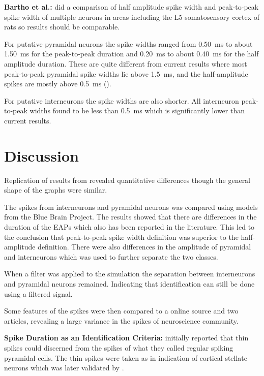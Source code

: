 \documentclass[altfont, fleqn]{uiophd}
\renewcommand{\cref}[1]{{\color{viridis_03}\mycref{#1}}}
\begin{document}
\noindent
{\bf Bartho et al.:}
\Textcite{bartho_characterization_2004}
did a comparison of half amplitude spike width and peak-to-peak spike
width of multiple neurons in areas including the 
L5 somatosensory cortex of rats 
so results should be comparable. 

For putative pyramidal neurons the 
spike widths ranged from 
\SI{0.50}{\milli\second} 
to about
\SI{1.50}{\milli\second} 
for the peak-to-peak duration 
and
\SI{0.20}{\milli\second} 
to about
\SI{0.40}{\milli\second} 
for the half amplitude duration. 
These are quite different from current results where
most peak-to-peak pyramidal spike widths lie above
\SI{1.5}{\milli\second}, 
and the half-amplitude spikes are mostly above
\SI{0.5}{\milli\second} 
(\cref{fig:4_width_I_II_histograms}).

For putative interneurons the 
spike widths are also shorter. 
All interneuron peak-to-peak widths found to be less than
\SI{0.5}{\milli\second} 
which is significantly lower than current results. 
\newline

\chapter{Discussion}
Replication of results from 
\textcite{pettersen_amplitude_2008}
revealed quantitative differences though
the general shape of the graphs were similar.

The spikes from interneurons and pyramidal neurons
was compared using models from the Blue Brain Project. 
The results showed that there are differences in the 
duration of the EAPs which
also has been reported in the literature. 
This led to the conclusion
that peak-to-peak spike width definition
was superior to the half-amplitude definition.
There were also differences in the amplitude of pyramidal
and interneurons
which was used to further separate the two classes.

When a filter was applied to the simulation the
separation between interneurons and pyramidal neurons
remained.
Indicating that identification can still be done using a filtered
signal.

Some features of the spikes were then compared to a 
online source and two articles, revealing 
a large variance in the spikes of neuroscience community.
\newline

{\bf Spike Duration as an Identification Criteria:}
\Textcite{mountcastle_cortical_1969}
initially reported that thin spikes could discerned
from the spikes of 
what they called regular spiking pyramidal cells.
The thin spikes were taken as in indication of 
cortical stellate neurons which was
later validated by 
\textcite{mccormick_comparative_1985}. 
\end{document}

